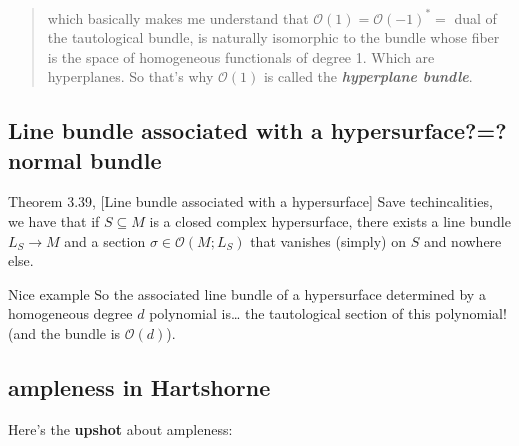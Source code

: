 \begin{quotation}
	which basically makes me understand that $\mathcal{O}(1)=\mathcal{O}(-1)^*=$ dual of the tautological bundle, is naturally isomorphic to the bundle whose fiber is the space of homogeneous functionals of degree 1. Which are hyperplanes. So that's why $\mathcal{O}(1)$ is called the \textit{\textbf{hyperplane bundle}}.
\end{quotation}

\subsection*{Line bundle associated with a hypersurface?=?normal bundle}

\begin{thing4}{Theorem 3.39, \cite{lec}}[Line bundle associated with a hypersurface]\label{thm:3.39, lec}\leavevmode
Save techincalities, we have that if \(S \subseteq M\) is a closed complex hypersurface, there exists a line bundle \(L_S \to M\) and a section \(\sigma \in \mathcal{O}(M;L_S)\) that vanishes (simply) on \(S\) and nowhere else.
\end{thing4}

\begin{thing8}{Nice example}\leavevmode
So the associated line bundle of a hypersurface determined by a homogeneous degree \(d\) polynomial is… the tautological section of this polynomial! (and the bundle is \(\mathcal{O}(d)\)).
\end{thing8}




\subsection*{ampleness in Hartshorne}

Here's the \textbf{upshot} about ampleness:

